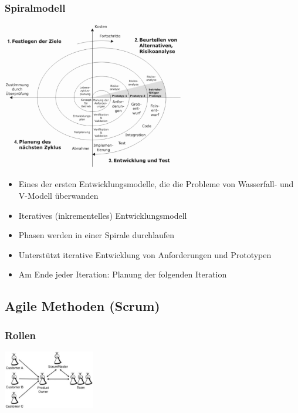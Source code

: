 \documentclass[11pt, a4paper]{article}
\begin{document}
\subsubsection{Spiralmodell}

\centering \includegraphics[width=0.6\textwidth]{Vorgehen-07.png} 

\raggedright

\begin{itemize}
    \item Eines der ersten Entwicklungsmodelle, die die Probleme von Wasserfall- und V-Modell überwanden
    \item Iteratives (inkrementelles) Entwicklungsmodell
    \item Phasen werden in einer Spirale durchlaufen
    \item Unterstützt iterative Entwicklung von Anforderungen und Prototypen
    \item Am Ende jeder Iteration: Planung der folgenden Iteration
\end{itemize}

\newpage



\subsection{Agile Methoden (Scrum)}

\subsubsection{Rollen}

\centering \includegraphics[width=0.3\textwidth]{Scrum-00.png} 
\end{document}
